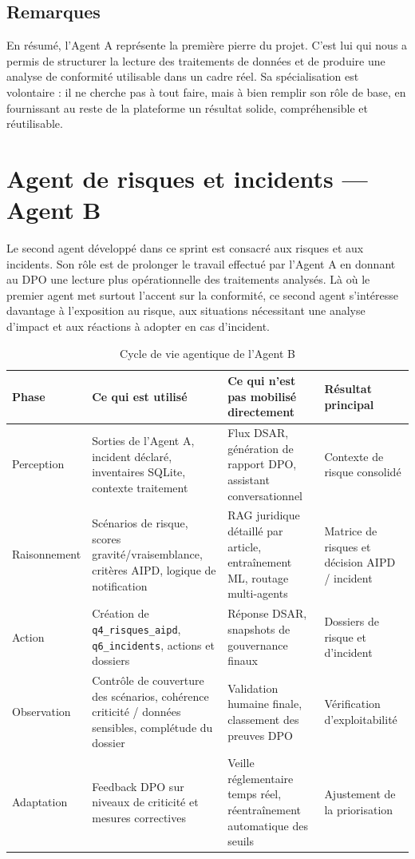 \documentclass[12pt,a4paper]{report}
\begin{document}
\subsection{Remarques}

En résumé, l'Agent A représente la première pierre du projet. C'est lui qui nous a permis de structurer la lecture des traitements de données et de produire une analyse de conformité utilisable dans un cadre réel. Sa spécialisation est volontaire : il ne cherche pas à tout faire, mais à bien remplir son rôle de base, en fournissant au reste de la plateforme un résultat solide, compréhensible et réutilisable.

\section{Agent de risques et incidents --- Agent B}

Le second agent développé dans ce sprint est consacré aux risques et aux incidents. Son rôle est de prolonger le travail effectué par l'Agent A en donnant au DPO une lecture plus opérationnelle des traitements analysés. Là où le premier agent met surtout l'accent sur la conformité, ce second agent s'intéresse davantage à l'exposition au risque, aux situations nécessitant une analyse d'impact et aux réactions à adopter en cas d'incident.

\begin{table}[H]
\centering
\caption{Cycle de vie agentique de l'Agent B}
\label{tab:cycle_agent_b}
\begin{tabularx}{\textwidth}{|p{2.2cm}|X|X|X|}
\hline
\textbf{Phase} & \textbf{Ce qui est utilisé} & \textbf{Ce qui n'est pas mobilisé directement} & \textbf{Résultat principal} \\
\hline
Perception & Sorties de l'Agent A, incident déclaré, inventaires SQLite, contexte traitement & Flux DSAR, génération de rapport DPO, assistant conversationnel & Contexte de risque consolidé \\
\hline
Raisonnement & Scénarios de risque, scores gravité/vraisemblance, critères AIPD, logique de notification & RAG juridique détaillé par article, entraînement ML, routage multi-agents & Matrice de risques et décision AIPD / incident \\
\hline
Action & Création de \texttt{q4\_risques\_aipd}, \texttt{q6\_incidents}, actions et dossiers & Réponse DSAR, snapshots de gouvernance finaux & Dossiers de risque et d'incident \\
\hline
Observation & Contrôle de couverture des scénarios, cohérence criticité / données sensibles, complétude du dossier & Validation humaine finale, classement des preuves DPO & Vérification d'exploitabilité \\
\hline
Adaptation & Feedback DPO sur niveaux de criticité et mesures correctives & Veille réglementaire temps réel, réentraînement automatique des seuils & Ajustement de la priorisation \\
\hline
\end{tabularx}
\end{table}
\end{document}
